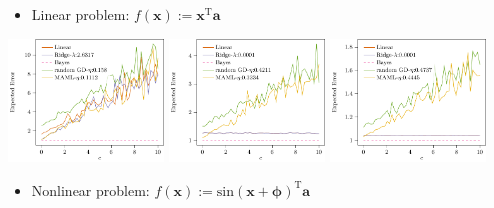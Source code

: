 \documentclass[a0paper,portrait]{baposter}
\begin{document}
\begin{poster}
{
  \begin{itemize}
    \color{Pink} \item \color{Black} Linear problem: $f(\mathbf{x}):=\mathbf{x}^\text{T}\mathbf{a}$

  \end{itemize}

  \begin{center}
  \includegraphics[width=0.31\textwidth]{lin_c_1.pdf}%
  \includegraphics[width=0.31\textwidth]{lin_c_2.pdf}%
  \includegraphics[width=0.31\textwidth]{lin_c_3.pdf}%
  \end{center}

  \begin{itemize}
    \color{Pink} \item \color{Black} Nonlinear problem: $f(\mathbf{x}):=\text{sin}(\mathbf{x}+\boldsymbol{\phi})^{\text{T}}\mathbf{a}$

  \end{itemize}

}
\end{poster}
\end{document}
